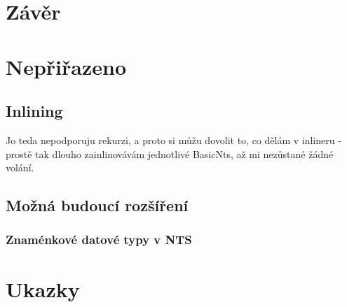 \documentclass{fithesis2}
\begin{document}

\chapter{Závěr}



\chapter{Nepřiřazeno}
\section{Inlining}
Jo teda nepodporuju rekurzi, a proto si můžu dovolit to, co dělám v inlineru - prostě tak dlouho zainlinovávám jednotlivé BasicNts, až mi nezůstané žádné volání.

\section{Možná budoucí rozšíření}

\subsection{Znaménkové datové typy v NTS}

\chapter{Ukazky}
\end{document}
